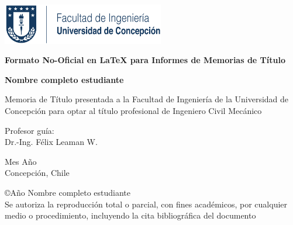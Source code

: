 	
\begin{center}
	
\includegraphics[height=50pt]{inge.png}
\vspace{5cm}


{\Large
\textbf{Formato No-Oficial en \LaTeX{} para Informes de Memorias de Título \\}
}
\vspace{2.5cm}

{\large
\textbf{Nombre completo estudiante\\}
}
\vspace{2.5cm}

{\normalsize
Memoria de Título presentada a la Facultad de Ingeniería de la Universidad de Concepción para optar al título profesional de Ingeniero Civil Mecánico\\
}
\vspace{2.5cm}


{\normalsize
Profesor guía:\\
Dr.-Ing. Félix Leaman W.
}
\vspace{0.5cm}

{\normalsize
Mes Año\\
Concepción, Chile
}
\vspace*{\fill}




\end{center}

{\footnotesize
\copyright Año Nombre completo estudiante\\
Se autoriza la reproducción total o parcial, con fines académicos, por cualquier medio o procedimiento, incluyendo la cita bibliográfica del documento
}
\vspace{0.5cm}

